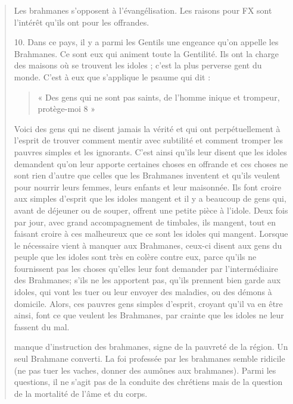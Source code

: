 \begin{quote}
\begin{Synthesis}
Les brahmanes s'opposent à l'évangélisation. Les raisons pour FX sont l'intérêt qu'ils ont pour les offrandes. 
\end{Synthesis}

10. Dans ce pays, il y a parmi les Gentils une engeance qu'on
appelle les Brahmanes. Ce sont eux qui animent toute la Gentilité.
Ils ont la charge des maisons où se trouvent les idoles ; c'est la plus
perverse gent du monde. C'est à eux que s'applique le psaume qui
dit : \begin{quote}
    « Des gens qui ne sont pas saints, de l'homme inique et trompeur,
protège-moi 8 » 
\end{quote}Voici des gens qui ne disent jamais la vérité
et qui ont perpétuellement à l'esprit de trouver comment mentir
avec subtilité et comment tromper les pauvres simples et les ignorants.
C'est ainsi qu'ils leur disent que les idoles demandent qu'on
leur apporte certaines choses en offrande et ces choses ne sont rien
d'autre que celles que les Brahmanes inventent et qu'ils veulent
pour nourrir leurs femmes, leurs enfants et leur maisonnée. Ils font
croire aux simples d'esprit que les idoles mangent et il y a beaucoup
de gens qui, avant de déjeuner ou de souper, offrent une
petite pièce à l'idole. Deux fois par jour, avec grand accompagnement
de timbales, ils mangent, tout en faisant croire à ces malheureux
que ce sont les idoles qui mangent. Lorsque le nécessaire vient
à manquer aux Brahmanes, ceux-ci disent aux gens du peuple que
les idoles sont très en colère contre eux, parce qu'ils ne fournissent
pas les choses qu'elles leur font demander par l'intermédiaire
  des Brahmanes; s'ils ne les apportent pas, qu'ils prennent bien
garde aux idoles, qui vont les tuer ou leur envoyer des maladies,
ou des démons à domicile. Alors, ces pauvres gens simples d'esprit,
croyant qu'il va en être ainsi, font ce que veulent les Brahmanes,
par crainte que les idoles ne leur fassent du mal.


\begin{Synthesis}
manque d'instruction des brahmanes, signe de la pauvreté de la région. Un seul Brahmane converti.
La foi professée par les brahmanes semble ridicile (ne pas tuer les vaches, donner des aumônes aux brahmanes). 
Parmi les questions, il ne s'agit pas de la conduite des chrétiens mais de la question de la mortalité de l'âme et du corps. 
\end{Synthesis}


\end{quote}
